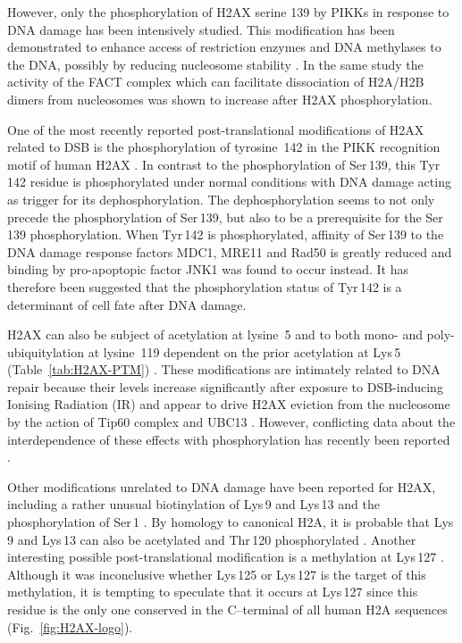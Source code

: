 \documentclass[graybox]{svmult}
\begin{document}
However, only the phosphorylation of H2AX serine 139 by PIKKs in response to DNA damage has been
intensively studied. This modification has been demonstrated to enhance access of restriction
enzymes and DNA methylases to the DNA, possibly by reducing nucleosome stability \cite{KHHK+08}. In
the same study the activity of the FACT complex which can facilitate dissociation of H2A/H2B dimers
from nucleosomes was shown to increase after H2AX phosphorylation.

One of the most recently reported post-translational modifications of H2AX related to DSB is the
phosphorylation of tyrosine~142 in the PIKK recognition motif of human H2AX \cite{XLS+09,CJT+09}. In
contrast to the phosphorylation of Ser\,139, this Tyr\,142 residue is phosphorylated under normal
conditions with DNA damage acting as trigger for its dephosphorylation. The dephosphorylation seems
to not only precede the phosphorylation of Ser\,139, but also to be a prerequisite for the Ser\,139
phosphorylation. When Tyr\,142 is phosphorylated, affinity of Ser\,139 to the DNA damage response
factors MDC1, MRE11 and Rad50 is greatly reduced and binding by pro-apoptopic factor JNK1 was found
to occur instead. It has therefore been suggested that the phosphorylation status of Tyr\,142 is a
determinant of cell fate after DNA damage.

H2AX can also be subject of acetylation at lysine~5 \cite{PB81} and to both mono- and poly-ubiquitylation
at lysine~119 dependent on the prior acetylation at Lys\,5 (Table~\ref{tab:H2AX-PTM}) \cite{ITK+07}. These
modifications are intimately related to DNA repair because their levels increase significantly after
exposure to DSB-inducing Ionising Radiation (IR) and appear to drive H2AX eviction from the nucleosome
by the action of Tip60 complex and UBC13 \cite{ITK+07}. However, conflicting data about the
interdependence of these effects with phosphorylation has recently been reported \cite{RVD+09}.

Other modifications unrelated to DNA damage have been reported for H2AX, including a rather unusual
biotinylation of Lys\,9 and Lys\,13 \cite{CCK+06} and the phosphorylation of Ser\,1 \cite{PB81}. By
homology to canonical H2A, it is probable that Lys\,9 and Lys\,13 can also be acetylated \cite{ZEP+03}
and Thr\,120 phosphorylated \cite{ANY+04}. Another interesting possible post-translational modification
is a methylation at Lys\,127 \cite{ZEP+03}. Although it was inconclusive whether Lys\,125 or Lys\,127
is the target of this methylation, it is tempting to speculate that it occurs at Lys\,127 since this
residue is the only one conserved in the C--terminal of all human H2A sequences (Fig.~\ref{fig:H2AX-logo}).
\end{document}
